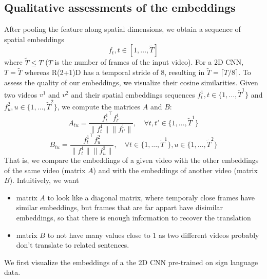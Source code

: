 \documentclass[final]{cvpr}
\begin{document}
\subsection{Qualitative assessments of the embeddings}
After pooling the feature along spatial dimensions, we obtain a sequence of spatial embeddings
$$f_t, t\in[1, ..., \tilde{T}]$$
where $\tilde{T}\leq T$ ($T$ is the number of frames of the input video). For a 2D CNN, $T=\tilde{T}$ whereas R(2+1)D has a temporal stride of $8$, resulting in $\tilde{T} = \lceil T/8 \rceil$.
To assess the quality of our embeddings, we visualize their cosine similarities. Given two videos $v^1$ and $v^2$ and their spatial embeddings sequences $f_t^1, t\in\{1, ..., \tilde{T}^1\}$ and $f_u^2, u\in \{1, ...,  \tilde{T}^2\}$, we compute the matrices $A$ and $B$:
$$A_{tu} = \frac{{f_t^1}^\intercal f_{t'}^1}{\lVert f_t^1 \rVert \lVert f_{t'}^1 \rVert}, \quad\forall t, t' \in\{1, ..., \tilde{T}^1\}$$
$$B_{tu} = \frac{{f_t^1}^\intercal f_u^2}{\lVert f_t^1 \rVert \lVert f_u^2 \rVert}, \quad \forall t \in\{1, ..., \tilde{T}^1\}, u \in\{1, ..., \tilde{T}^2\}$$
That is, we compare the embeddings of a given video with the other embeddings of the same video (matrix $A$) and with the embeddings of another video (matrix $B$). Intuitively, we want 
\begin{itemize}
	\item matrix $A$ to look like a diagonal matrix, where temporaly close frames have similar embeddings, but frames that are far appart have disimilar embeddings, so that there is enough information to recover the translation
	\item matrix $B$ to not have many values close to $1$ as two different videos probably don't translate to related sentences.
\end{itemize}

We first visualize the embeddings of a the 2D CNN pre-trained on sign language data.


{\small


}
\end{document}
